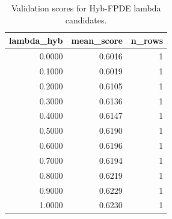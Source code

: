 \begin{table}[t]
\caption{Validation scores for Hyb-FPDE lambda candidates.}
\label{tab:lambda_distribution_computed}
\centering
\begin{tabular}{rrr}
\toprule
lambda\_hyb & mean\_score & n\_rows \\
\midrule
0.0000 & 0.6016 & 1 \\
0.1000 & 0.6019 & 1 \\
0.2000 & 0.6105 & 1 \\
0.3000 & 0.6136 & 1 \\
0.4000 & 0.6147 & 1 \\
0.5000 & 0.6190 & 1 \\
0.6000 & 0.6196 & 1 \\
0.7000 & 0.6194 & 1 \\
0.8000 & 0.6219 & 1 \\
0.9000 & 0.6229 & 1 \\
1.0000 & 0.6230 & 1 \\
\bottomrule
\end{tabular}

\end{table}
